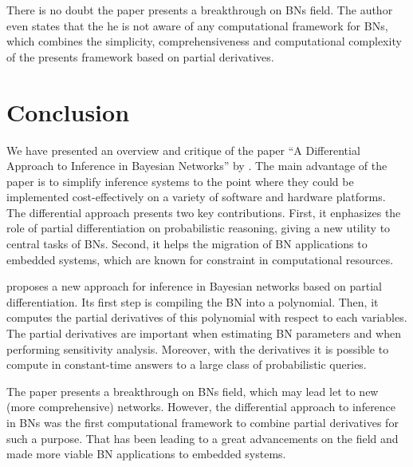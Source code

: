 \documentclass[twoside,11pt]{article}
\begin{document}
There is no doubt the paper presents a breakthrough on BNs field.
The author even states that the he is not aware of any computational framework for BNs, which combines the simplicity, comprehensiveness and computational complexity of the presents framework based on partial derivatives.

 
\section{Conclusion}
\label{sec:conc}

We have presented an overview and critique of the paper ``A Differential Approach to Inference in Bayesian Networks'' by \cite{darwiche00}.
The main advantage of the paper is to simplify inference systems to the point where they could be implemented cost-effectively on a variety of software and hardware platforms.
The differential approach presents two key contributions.
First, it enphasizes the role of partial differentiation on probabilistic reasoning, giving a new utility to central tasks of BNs.
Second, it helps the migration of BN applications to embedded systems, which are known for constraint in computational resources.

\cite{darwiche00} proposes a new approach for inference in Bayesian networks based on partial differentiation.
Its first step is compiling the BN into a polynomial.
Then, it computes the partial derivatives of this polynomial with respect to each variables.
The partial derivatives are important when estimating BN parameters and when performing sensitivity analysis.
Moreover, with the derivatives it is possible to compute in constant-time answers to a large class of probabilistic queries.

The paper presents a breakthrough on BNs field, which may lead let to new (more comprehensive) networks. 
However, the differential approach to inference in BNs was the first computational framework to combine partial derivatives for such a purpose.
That has been leading to a great advancements on the field and made more viable BN applications to embedded systems.

\vskip 0.2in

\end{document}
